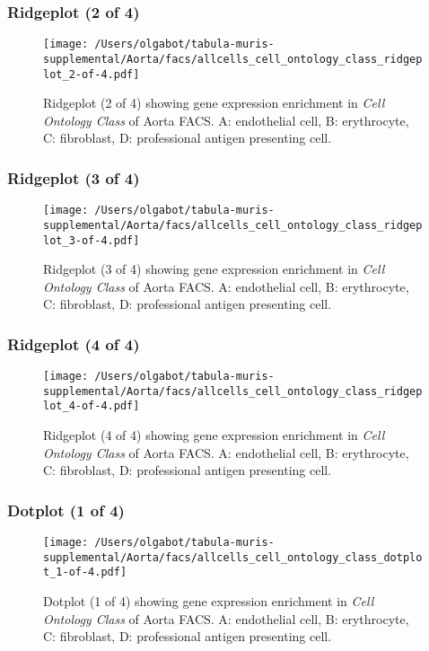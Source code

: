 \clearpage
\subsubsection{Ridgeplot (2 of 4)}
\begin{figure}[h]
\centering
\texttt{[image: /Users/olgabot/tabula-muris-supplemental/Aorta/facs/allcells\_cell\_ontology\_class\_ridgeplot\_2-of-4.pdf]}

\caption{ Ridgeplot (2 of 4)  showing gene expression enrichment in \emph{Cell Ontology Class} of Aorta FACS. A: endothelial cell, B: erythrocyte, C: fibroblast, D: professional antigen presenting cell.}
\end{figure}


\clearpage
\subsubsection{Ridgeplot (3 of 4)}
\begin{figure}[h]
\centering
\texttt{[image: /Users/olgabot/tabula-muris-supplemental/Aorta/facs/allcells\_cell\_ontology\_class\_ridgeplot\_3-of-4.pdf]}

\caption{ Ridgeplot (3 of 4)  showing gene expression enrichment in \emph{Cell Ontology Class} of Aorta FACS. A: endothelial cell, B: erythrocyte, C: fibroblast, D: professional antigen presenting cell.}
\end{figure}


\clearpage
\subsubsection{Ridgeplot (4 of 4)}
\begin{figure}[h]
\centering
\texttt{[image: /Users/olgabot/tabula-muris-supplemental/Aorta/facs/allcells\_cell\_ontology\_class\_ridgeplot\_4-of-4.pdf]}

\caption{ Ridgeplot (4 of 4)  showing gene expression enrichment in \emph{Cell Ontology Class} of Aorta FACS. A: endothelial cell, B: erythrocyte, C: fibroblast, D: professional antigen presenting cell.}
\end{figure}


\clearpage
\subsubsection{Dotplot (1 of 4)}
\begin{figure}[h]
\centering
\texttt{[image: /Users/olgabot/tabula-muris-supplemental/Aorta/facs/allcells\_cell\_ontology\_class\_dotplot\_1-of-4.pdf]}

\caption{ Dotplot (1 of 4)  showing gene expression enrichment in \emph{Cell Ontology Class} of Aorta FACS. A: endothelial cell, B: erythrocyte, C: fibroblast, D: professional antigen presenting cell.}
\end{figure}


